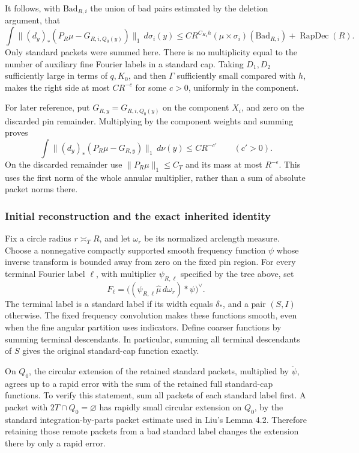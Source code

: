 It follows, with \(\mathrm{Bad}_{R,i}\) the union of bad pairs estimated
by the deletion argument, that
\begin{equation}\label{fprof:badL1}
 \int\|(d_y)_*(P_R\mu-G_{R,i,Q_0(y)})\|_1\,d\sigma_i(y)
 \leq C R^{C_{K_0}h}(\mu\times\sigma_i)(\mathrm{Bad}_{R,i})
       +\operatorname{RapDec}(R).
\end{equation}
Only standard packets were summed here. There is no multiplicity equal
to the number of auxiliary fine Fourier labels in a standard cap.
Taking \(D_1,D_2\) sufficiently large in terms of \(q,K_0\), and then
\(\Gamma\) sufficiently small compared with \(h\), makes the right
side at most \(CR^{-c}\) for some \(c>0\), uniformly in the component.

For later reference, put \(G_{R,y}=G_{R,i,Q_0(y)}\) on the component
\(X_i\), and zero on the discarded pin remainder. Multiplying by the
component weights and summing proves
\begin{equation}\label{uf:jointL1}
 \int\|(d_y)_*(P_R\mu-G_{R,y})\|_1\,d\nu(y)\leq CR^{-c'}
 \qquad(c'>0).
\end{equation}
On the discarded remainder use \(\|P_R\mu\|_1\leq C_T\) and its
mass at most \(R^{-\epsilon}\). This uses the first norm of the whole
annular multiplier, rather than a sum of absolute packet norms there.

\subsubsection*{Initial reconstruction and the exact inherited identity}

Fix a circle radius \(r\asymp_T R\), and let \(\omega_r\) be its
normalized arclength measure. Choose a nonnegative compactly supported
smooth frequency function \(\psi\) whose inverse transform is bounded
away from zero on the fixed pin region. For every terminal Fourier
label \(\ell\), with multiplier \(\psi_{R,\ell}\) specified by the
tree above, set
$$
 F_\ell=\big((\psi_{R,\ell}\widehat\mu\,d\omega_r)*\psi\big)^\vee.
$$
The terminal label is a standard label if its width equals
\(\delta_*\), and a pair \((S,I)\) otherwise. The fixed frequency
convolution makes these functions smooth, even when the fine angular
partition uses indicators. Define coarser functions by summing terminal
descendants. In particular, summing all terminal descendants of \(S\)
gives the original standard-cap function exactly.

On \(Q_0\), the circular extension of the retained standard packets,
multiplied by \(\check\psi\), agrees up to a rapid error with the sum
of the retained full standard-cap functions. To verify this statement,
sum all packets of each standard label first. A packet with
\(2T\cap Q_0=\varnothing\) has rapidly small circular extension on
\(Q_0\), by the standard integration-by-parts packet estimate used in
Liu's Lemma 4.2. Therefore retaining those remote packets from a bad
standard label changes the extension there by only a rapid error.

